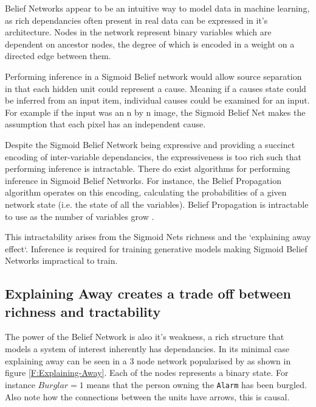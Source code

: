     Belief Networks appear to be an intuitive way to model data in machine learning, as rich dependancies often present in real data can be expressed in it's architecture. Nodes in the network represent binary variables which are dependent on ancestor nodes, the degree of which is encoded in a weight on a directed edge between them.

    Performing inference in a Sigmoid Belief network would allow source separation in that each hidden unit could represent a cause. Meaning if a causes state could be inferred from an input item, individual causes could be examined for an input. For example if the input was an n by n image, the Sigmoid Belief Net makes the assumption that each pixel has an independent cause.

    Despite the Sigmoid Belief Network being expressive and providing a succinct encoding of inter-variable dependancies, the expressiveness is too rich such that performing inference is intractable. There do exist algorithms for performing inference in Sigmoid Belief Networks. For instance, the Belief Propagation algorithm  operates on this encoding, calculating the probabilities of a given network state (i.e. the state of all the variables).  Belief Propagation is intractable to use as the number of variables grow .

    This intractability arises from the Sigmoid Nets richness and the `explaining away effect`. Inference is required for training generative models making Sigmoid Belief Networks impractical to train. 

    \subsection{Explaining Away creates a trade off between richness and tractability}
    \todo%
    The power of the Belief Network is also it's weakness, a rich structure that models a system of interest inherently has dependancies. In its minimal case explaining away can be seen in a 3 node network popularised by  as shown in figure \ref{F:Explaining-Away}. Each of the nodes represents a binary state. For instance $Burglar = 1$ means that the person owning the \texttt{Alarm} has been burgled. Also note how the connections between the units have arrows, this is causal.

